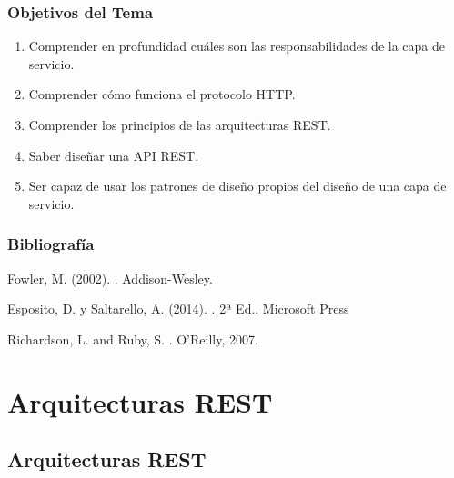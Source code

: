\documentclass[handout,a4paper,slidestop,xcolor=pst,blue]{beamer}
\begin{document}
\begin{frame}[c]
    \frametitle{Objetivos del Tema}
    \begin{enumerate}[<+->]
         \item Comprender en profundidad cuáles son las responsabilidades de la capa de servicio.
         \item Comprender cómo funciona el protocolo HTTP.
         \item Comprender los principios de las arquitecturas REST.
         \item Saber diseñar una API REST.
         \item Ser capaz de usar los patrones de diseño propios del diseño de una capa de servicio.
    \end{enumerate}
\end{frame}

\begin{frame}[c]
    \frametitle{Bibliografía}
    \begin{thebibliography}{1}

        Fowler, M. (2002).
        .
        \newblock Addison-Wesley.

        Esposito, D. y Saltarello, A. (2014).
        . 2ª Ed..
        \newblock Microsoft Press

        Richardson, L. and Ruby, S.
        .
        \newblock  O'Reilly, 2007.

    \end{thebibliography}
\end{frame}

\section{Arquitecturas REST}

\subsection{Arquitecturas REST}
\end{document}
